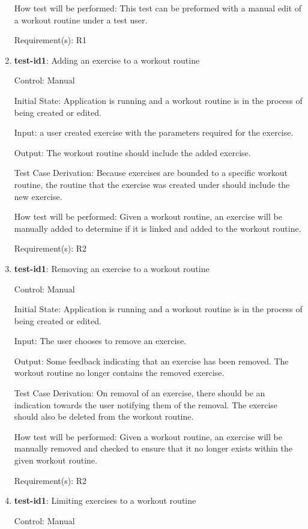 \documentclass[12pt, titlepage]{article}
\begin{document}
\begin{enumerate}
		How test will be performed: This test can be preformed with a manual edit of a workout routine under a test user.
		
		Requirement(s): R1
		
		\item{\textbf{test-id1}}: Adding an exercise to a workout routine

		Control: Manual
		
		Initial State: Application is running and a workout routine is in the process of being created or edited.
		
		Input: a user created exercise with the parameters required for the exercise.
		
		Output: The workout routine should include the added exercise.
		
		Test Case Derivation: Because exercises are bounded to a specific workout routine, the routine that the exercise was created under should include the new exercise.
		
		How test will be performed: Given a workout routine, an exercise will be manually added to determine if it is linked and added to the workout routine.
		
		Requirement(s): R2
		
		\item{\textbf{test-id1}}: Removing an exercise to a workout routine
		
		Control: Manual
		
		Initial State: Application is running and a workout routine is in the process of being created or edited.
		
		Input: The user chooses to remove an exercise.
		
		Output: Some feedback indicating that an exercise has been removed. The workout routine no longer contains the removed exercise.
		
		Test Case Derivation: On removal of an exercise, there should be an indication towards the user notifying them of the removal. The exercise should also be deleted from the workout routine.
		
		How test will be performed: Given a workout routine, an exercise will be manually removed and checked to ensure that it no longer exists within the given workout routine.
		
		Requirement(s): R2
		
		\item{\textbf{test-id1}}: Limiting exercises to a workout routine
		
		Control: Manual
		

\end{enumerate}
\end{document}
